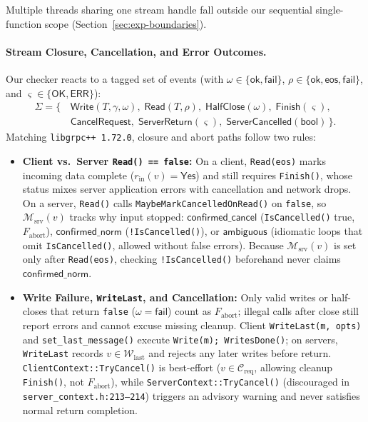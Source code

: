Multiple threads sharing one stream handle fall outside our sequential single-function scope (Section~\ref{sec:exp-boundaries}).

\paragraph{Stream Closure, Cancellation, and Error Outcomes.}
Our checker reacts to a tagged set of events (with $\omega \in \{\mathsf{ok}, \mathsf{fail}\}$, $\rho \in \{\mathsf{ok}, \mathsf{eos}, \mathsf{fail}\}$, and $\varsigma \in \{\mathsf{OK}, \mathsf{ERR}\}$):
\begin{equation}
\label{eq:alphabet}
\begin{aligned}
\Sigma = \bigl\{\,&
\mathsf{Write}(T, \gamma, \omega),\; \mathsf{Read}(T, \rho),\; \mathsf{HalfClose}(\omega),\; \mathsf{Finish}(\varsigma), \\
&\mathsf{CancelRequest},\; \mathsf{ServerReturn}(\varsigma),\; \mathsf{ServerCancelled}(\mathsf{bool})
\,\bigr\}.
\end{aligned}
\end{equation}
Matching \texttt{libgrpc++ 1.72.0}, closure and abort paths follow two rules:
\begin{itemize}
    \item \textbf{Client vs.\ Server \texttt{Read() == false}:} On a client, \texttt{Read(eos)} marks incoming data complete ($r_{\mathrm{in}}(v) = \mathsf{Yes}$) and still requires \texttt{Finish()}, whose status mixes server application errors with cancellation and network drops. On a server, \texttt{Read()} calls \texttt{MaybeMarkCancelledOnRead()} on \texttt{false}, so $\mathcal{M}_{\mathrm{srv}}(v)$ tracks why input stopped: $\mathsf{confirmed\_cancel}$ (\texttt{IsCancelled()} true, $F_{\mathrm{abort}}$), $\mathsf{confirmed\_norm}$ (\texttt{!IsCancelled()}), or $\mathsf{ambiguous}$ (idiomatic loops that omit \texttt{IsCancelled()}, allowed without false errors). Because $\mathcal{M}_{\mathrm{srv}}(v)$ is set only after \texttt{Read(eos)}, checking \texttt{!IsCancelled()} beforehand never claims $\mathsf{confirmed\_norm}$.
    \item \textbf{Write Failure, \texttt{WriteLast}, and Cancellation:} Only valid writes or half-closes that return \texttt{false} ($\omega = \mathsf{fail}$) count as $F_{\mathrm{abort}}$; illegal calls after close still report errors and cannot excuse missing cleanup. Client \texttt{WriteLast(m, opts)} and \texttt{set\_\allowbreak last\_\allowbreak message()} execute \texttt{Write(m); WritesDone()}; on servers, \texttt{WriteLast} records $v \in \mathcal{W}_{\mathrm{last}}$ and rejects any later writes before return. \texttt{ClientContext::\allowbreak TryCancel()} is best-effort ($v \in \mathcal{C}_{\mathrm{req}}$, allowing cleanup \texttt{Finish()}, not $F_{\mathrm{abort}}$), while \texttt{ServerContext::\allowbreak TryCancel()} (discouraged in \texttt{server\_\allowbreak context.h:213--214}) triggers an advisory warning and never satisfies normal return completion.
\end{itemize}

